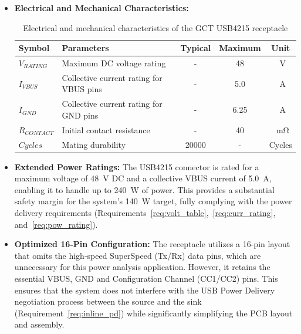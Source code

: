 \begin{itemize}

    \item \textbf{Electrical and Mechanical Characteristics:}

    \begin{table}[H]
        \centering
        \renewcommand{\arraystretch}{1.3}
        \caption{Electrical and mechanical characteristics of the GCT USB4215 receptacle}
        \label{tab:usb4215_characteristics}

        \begin{tabularx}{0.9\textwidth}{|l|X|c|c|c|}
            \hline
            \textbf{Symbol} &
            \textbf{Parameters} &
            \textbf{Typical} &
            \textbf{Maximum} &
            \textbf{Unit} \\
            \hline

            $V_{RATING}$ & Maximum DC voltage rating & - & 48 & \SI{}{\volt} \\
            \hline
            
            $I_{VBUS}$ & Collective current rating for VBUS pins & - & 5.0 & \SI{}{\ampere} \\
            \hline

            $I_{GND}$ & Collective current rating for GND pins & - & 6.25 & \SI{}{\ampere} \\
            \hline

            $R_{CONTACT}$ & Initial contact resistance & - & 40 & \SI{}{\milli\ohm} \\
            \hline
            
            $Cycles$ & Mating durability & 20000 & - & Cycles \\
            \hline

        \end{tabularx}
    \end{table}

    \item \textbf{Extended Power Ratings:} 
    The USB4215 connector is rated for a maximum voltage of \SI{48}{\volt} DC and a collective VBUS current of \SI{5.0}{\ampere}, enabling it to handle up to \SI{240}{\watt} of power. This provides a substantial safety margin for the system's \SI{140}{\watt} target, fully complying with the power delivery requirements (Requirements~\ref{req:volt_table},~\ref{req:curr_rating}, and~\ref{req:pow_rating}).

    \item \textbf{Optimized 16-Pin Configuration:} 
    The receptacle utilizes a 16-pin layout that omits the high-speed SuperSpeed (Tx/Rx) data pins, which are unnecessary for this power analysis application. However, it retains the essential VBUS, GND and Configuration Channel (CC1/CC2) pins. This ensures that the system does not interfere with the USB Power Delivery negotiation process between the source and the sink (Requirement~\ref{req:inline_pd}) while significantly simplifying the PCB layout and assembly.


\end{itemize}
